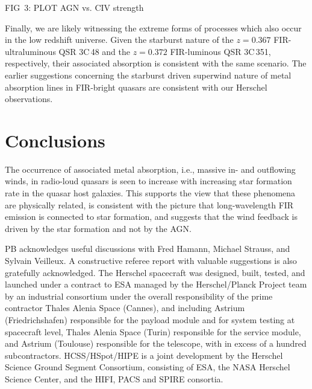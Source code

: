 \documentclass[preprint]{aastex}
\begin{document}
FIG~3: PLOT AGN vs. CIV strength

Finally, we are likely witnessing the extreme forms of processes which
also occur in the low redshift universe.  Given the starburst nature
\citep{canalizo00, westhues16} of the $z=0.367$ FIR-ultraluminous QSR
3C\,48 and the $z=0.372$ FIR-luminous QSR 3C\,351, respectively, their
associated  absorption \citep{gupta05, mathur94} is consistent
with the same scenario.  The earlier suggestions \citep{heckman90}
concerning the starburst driven superwind nature of metal absorption
lines in FIR-bright quasars are consistent with our Herschel
observations. 

\section{Conclusions}

The occurrence of associated metal absorption, i.e., massive in- and
outflowing winds, in radio-loud quasars is seen to increase with
increasing star formation rate in the quasar host galaxies.  This
supports the view that these phenomena are physically related, is
consistent with the picture that long-wavelength FIR emission is
connected to star formation, and suggests that the wind feedback is
driven by the star formation and not by the AGN. 

\acknowledgments

PB acknowledges useful discussions with Fred Hamann, Michael Strauss,
and Sylvain Veilleux. A constructive referee report with valuable
suggestions is also gratefully acknowledged. The Herschel spacecraft
was designed, built, tested, and launched under a contract to ESA
managed by the Herschel/Planck Project team by an industrial consortium
under the overall responsibility of the prime contractor Thales Alenia
Space (Cannes), and including Astrium (Friedrichshafen) responsible for
the payload module and for system testing at spacecraft level, Thales
Alenia Space (Turin) responsible for the service module, and Astrium
(Toulouse) responsible for the telescope, with in excess of a hundred
subcontractors.  HCSS/HSpot/HIPE is a joint development by the Herschel
Science Ground Segment Consortium, consisting of ESA, the NASA Herschel
Science Center, and the HIFI, PACS and SPIRE consortia. 
\end{document}
